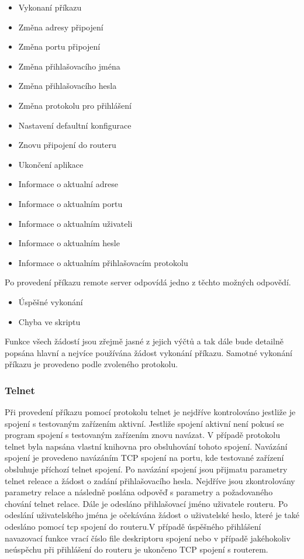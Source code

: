 \begin{itemize}
  \item Vykonaní příkazu
  \item Změna adresy připojení
  \item Změna portu připojení
  \item Změna přihlašovacího jména
  \item Změna přihlašovacího hesla
  \item Změna protokolu pro přihlášení
  \item Nastavení defaultní konfigurace
  \item Znovu připojení do routeru
  \item Ukončení aplikace
  \item Informace o aktualní adrese
  \item Informace o aktualním portu
  \item Informace o aktualním uživateli
  \item Informace o aktualním hesle
  \item Informace o aktualním přihlašovacím protokolu
\end{itemize}

Po provedení příkazu remote server odpovídá jedno z těchto možných odpovědí.

\begin{itemize}
  \item Úspěšné vykonání
  \item Chyba ve skriptu
\end{itemize}

Funkce všech žádostí jsou zřejmě jasné z jejich výčtů a tak dále bude detailně popsána hlavní a nejvíce používána žádost vykonání příkazu. Samotné vykonání příkazu je provedeno podle zvoleného protokolu.

\subsubsection{Telnet}
Při provedení příkazu pomocí protokolu telnet je nejdříve kontrolováno jestliže je spojení s testovaným zařízením aktivní. Jestliže spojení aktivní není pokusí se program spojení s testovaným zařízením znovu navázat. V případě protokolu telnet byla napsána vlastní knihovna pro obsluhování tohoto spojení. Navázání spojení je provedeno navázáním TCP spojení na portu, kde testované zařízení obsluhuje příchozí telnet spojení. Po navázání spojení jsou přijmatu parametry telnet releace a žádost o zadání přihlašovacího hesla. Nejdříve jsou zkontrolovány parametry relace a následně poslána odpověď s parametry a požadovaného chování telnet relace. Dále je odesláno přihlašovací jméno uživatele routeru. Po odeslání uživatelského jména je očekávána žádost o uživatelské heslo, které je také odesláno pomocí tcp spojení do routeru.V případě úspěšného přihlášení navazovací funkce vrací číslo file deskriptoru spojení nebo v případě jakéhokoliv neúspěchu při přihlášení do routeru je ukončeno TCP spojení s routerem.

